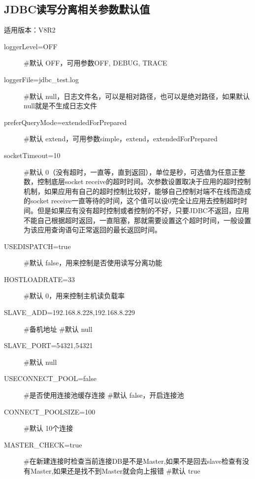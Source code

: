 \documentclass[letterpaper,10pt,english]{sphinxmanual}
\begin{document}
\subsection{JDBC读写分离相关参数默认值}
\label{\detokenize{interface/jdbc:id10}}
适用版本：V8R2
\begin{description}
\item[{loggerLevel=OFF}] \leavevmode
\#默认 OFF，可用参数OFF, DEBUG, TRACE

\item[{loggerFile=jdbc\_test.log}] \leavevmode
\#默认 null，日志文件名，可以是相对路径，也可以是绝对路径，如果默认null就是不生成日志文件

\item[{preferQueryMode=extendedForPrepared}] \leavevmode
\#默认 extend，可用参数simple，extend，extendedForPrepared

\item[{socketTimeout=10}] \leavevmode
\#默认 0（没有超时，一直等，直到返回），单位是秒，可选值为任意正整数，控制底层socket receive的超时时间。次参数设置取决于应用的超时控制机制，如果应用有自己的超时控制比较好，能够自己控制对端不在线而造成的socket receive一直等待的时间，这个值可以设0完全让应用去控制超时时间。但是如果应有没有超时控制或者控制的不好，只要JDBC不返回，应用不能自己根据超时返回，一直阻塞，那就需要设置这个超时时间，一般设置为该应用查询语句正常返回的最长返回时间。

\item[{USEDISPATCH=true}] \leavevmode
\#默认 false，用来控制是否使用读写分离功能

\item[{HOSTLOADRATE=33}] \leavevmode
\#默认 0，用来控制主机读负载率

\item[{SLAVE\_ADD=192.168.8.228,192.168.8.229}] \leavevmode
\#备机地址
\#默认 null

\item[{SLAVE\_PORT=54321,54321}] \leavevmode
\#默认 null

\item[{USECONNECT\_POOL=false}] \leavevmode
\#是否使用连接池缓存连接
\#默认 false，开启连接池

\item[{CONNECT\_POOLSIZE=100}] \leavevmode
\#默认 10个连接

\item[{MASTER\_CHECK=true}] \leavevmode
\#在新建连接时检查当前连接DB是不是Master,如果不是回去slave检查有没有Master,如果还是找不到Master就会向上报错
\#默认 true


\end{description}
\end{document}
